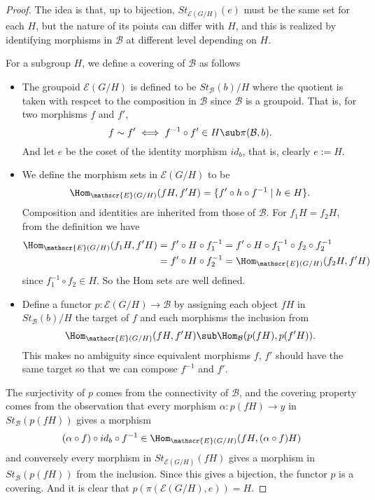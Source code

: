 \begin{proof}
The idea is that, up to bijection, $St_{\mathcal{E}(G/H)}(e)$ must be the same set for each $H$, but the nature of its points can differ with $H$, and this is realized by identifying morphisms in $\mathcal{B}$ at different level depending on $H$.\par
For a subgroup $H$, we define a covering of $\mathcal{B}$ as follows
\begin{itemize}
\item The groupoid $\mathscr{E}(G/H)$ is defined to be $St_{\mathcal{B}}(b)/H$ where the quotient is taken with respcet to the composition in $\mathcal{B}$ since $\mathcal{B}$ is a groupoid. That is, for two morphisms $f$ and $f'$,
\[f\sim f'\iff f^{-1}\circ f'\in H\sub\pi(\mathcal{B},b).\]
And let $e$ be the coset of the identity morphism $id_b$, that is, clearly $e:=H$.
\item We define the morphism sets in $\mathscr{E}(G/H)$ to be
\[\Hom_{\mathscr{E}(G/H)}(fH,f'H)=\{f'\circ h\circ f^{-1}\mid h\in H\}.\]
Composition and identities are inherited from those of $\mathcal{B}$. For $f_1H=f_2H$, from the definition we have
\begin{align*}
\Hom_{\mathscr{E}(G/H)}(f_1H,f'H)&=f'\circ H\circ f_1^{-1}=f'\circ H\circ f_1^{-1}\circ f_2\circ f_2^{-1}\\
&=f'\circ H\circ f^{-1}_2=\Hom_{\mathscr{E}(G/H)}(f_2H,f'H)
\end{align*}
since $f_1^{-1}\circ f_2\in H$. So the Hom sets are well defined.
\item Define a functor $p:\mathscr{E}(G/H)\to\mathcal{B}$ by assigning each object $fH$ in $St_{\mathcal{B}}(b)/H$ the target of $f$ and each morphisms the inclusion from
\[\Hom_{\mathscr{E}(G/H)}(fH,f'H)\sub\Hom_{\mathcal{B}}(p(fH),p(f'H)).\]
This makes no ambiguity since equivalent morphisms $f$, $f'$ should have the same target so that we can compose $f^{-1}$ and $f'$.
\end{itemize}
The surjectivity of $p$ comes from the connectivity of $\mathcal{B}$, and the covering property comes from the observation that every morphism $\alpha:p(fH)\to y$ in $St_{\mathcal{B}}(p(fH))$ gives a morphism
\[(\alpha\circ f)\circ id_b\circ f^{-1}\in\Hom_{\mathscr{E}(G/H)}(fH,(\alpha\circ f)H)\]
and conversely every morphism in $St_{\mathscr{E}(G/H)}(fH)$ gives a morphism in $St_{\mathcal{B}}(p(fH))$ from the inclusion. Since this gives a bijection, the functor $p$ is a covering. And it is clear that $p(\pi(\mathscr{E}(G/H),e))=H$.\par

\end{proof}
